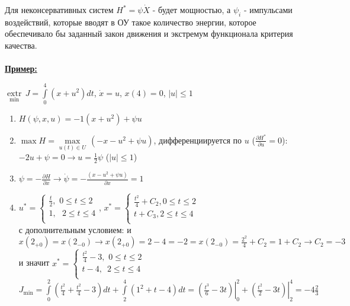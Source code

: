 \documentclass[preprint,russian,a5paper,10pt,twoside,mediummath]{ncc}
\newcommand{\ExampleMy}{\vspace{\baselineskip}\textbf{\underline{Пример:}}\nopagebreak\par}
\begin{document}
\par Для неконсервативных систем ${{H}^{*}}=\psi \dot{X}$ - будет мощностью, а ${{\psi }_{i}}$ - импульсами воздействий, которые вводят в ОУ такое количество энергии, которое обеспечивало бы заданный закон движения и экстремум функционала критерия качества.
\\
\\
\ExampleMy   $\underset{\min }{\mathop{extr}}\,J=\int\limits_{0}^{4}{\left( x+{{u}^{2}} \right)}dt$, $\dot{x}=u$, $x\left( 4 \right)=0$, $\left| u \right|\le 1$
\begin{enumerate}
\item $H\left( \psi ,x,u \right)=-1\left( x+{{u}^{2}} \right)+\psi u$
\item $\max H=\underset{u\left( t \right)\in U}{\mathop{\max }}\,\left( -x-{{u}^{2}}+\psi u \right)$, дифференциируется по $u$ ($\frac{\partial {{H}^{*}}}{\partial u}=0$):$-2u+\psi =0\to u=\frac{1}{2}\psi $ ($\left| u \right|\le 1$)
\item $\psi =-\frac{\partial H}{\partial x}\to \dot{\psi }=-\frac{\left( x-{{u}^{2}}+\psi u \right)}{\partial x}=1$
\item ${{u}^{*}}=\left\{ \begin{array}{*{35}{l}}
   \frac{t}{2},\,\,0\le t\le 2  \\
   1,\,\,\,\,2\le t\le 4  \\
\end{array} \right.$, ${{x}^{*}}=\left\{ \begin{array}{*{35}{l}}
   \frac{{{t}^{2}}}{4}+{{C}_{2}},0\le t\le 2  \\
   t+{{C}_{3}},2\le t\le 4  \\
\end{array} \right.$
\\с дополнительным условием: 
и $x\left( {{2}_{+0}} \right)=x\left( {{2}_{-0}} \right)\to x\left( {{2}_{+0}} \right)=2-4=-2=x\left( {{2}_{-0}} \right)=\frac{{{2}^{2}}}{4}+{{C}_{2}}=1+{{C}_{2}}\to {{C}_{2}}=-3$ и значит ${{x}^{*}}=\left\{ \begin{array}{*{35}{l}}
   \frac{{{t}^{2}}}{4}-3,\,\,0\le t\le 2  \\
   t-4,\,\,\,2\le t\le 4  \\
\end{array} \right.$
\\${{J}_{\min }}=\int\limits_{0}^{2}{\left( \frac{{{t}^{2}}}{4}+\frac{{{t}^{2}}}{4}-3 \right)}dt+\int\limits_{2}^{4}{\left( {{1}^{2}}+t-4 \right)}dt=\left. \left( \frac{{{t}^{3}}}{6}-3t \right) \right|_{0}^{2}+\left. \left( \frac{{{t}^{2}}}{2}-3t \right) \right|_{2}^{4}=-4\frac{2}{3}$ 
\end{enumerate}
\end{document}
